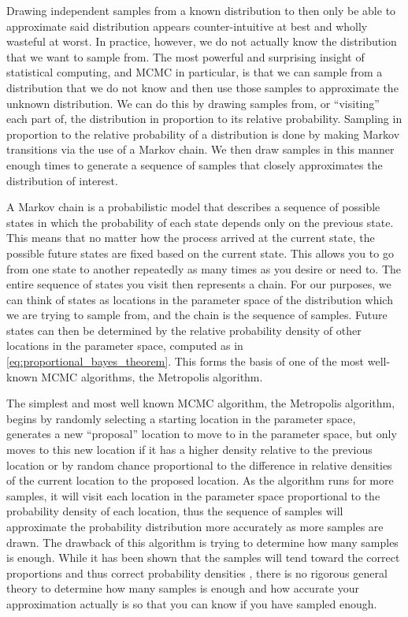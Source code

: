 Drawing independent samples from a known distribution to then only be able to approximate said distribution appears counter-intuitive at best and wholly wasteful at worst. In practice, however, we do not actually know the distribution that we want to sample from. The most powerful and surprising insight of statistical computing, and MCMC in particular, is that we can sample from a distribution that we do not know and then use those samples to approximate the unknown distribution. We can do this by drawing samples from, or ``visiting'' each part of, the distribution in proportion to its relative probability. Sampling in proportion to the relative probability of a distribution is done by making Markov transitions via the use of a Markov chain. We then draw samples in this manner enough times to generate a sequence of samples that closely approximates the distribution of interest.

A Markov chain is a probabilistic model that describes a sequence of possible states in which the probability of each state depends only on the previous state. This means that no matter how the process arrived at the current state, the possible future states are fixed based on the current state. This allows you to go from one state to another repeatedly as many times as you desire or need to. The entire sequence of states you visit then represents a chain. For our purposes, we can think of states as locations in the parameter space of the distribution which we are trying to sample from, and the chain is the sequence of samples. Future states can then be determined by the relative probability density of other locations in the parameter space, computed as in \ref{eq:proportional_bayes_theorem}. This forms the basis of one of the most well-known MCMC algorithms, the Metropolis algorithm.

The simplest and most well known MCMC algorithm, the Metropolis algorithm, begins by randomly selecting a starting location in the parameter space, generates a new ``proposal'' location to move to in the parameter space, but only moves to this new location if it has a higher density relative to the previous location or by random chance proportional to the difference in relative densities of the current location to the proposed location. As the algorithm runs for more samples, it will visit each location in the parameter space proportional to the probability density of each location, thus the sequence of samples will approximate the probability distribution more accurately as more samples are drawn. The drawback of this algorithm is trying to determine how many samples is enough. While it has been shown that the samples will tend toward the correct proportions and thus correct probability densities \cite{Metropolis1953} \cite{Hastings1970}, there is no rigorous general theory to determine how many samples is enough and how accurate your approximation actually is so that you can know if you have sampled enough.

